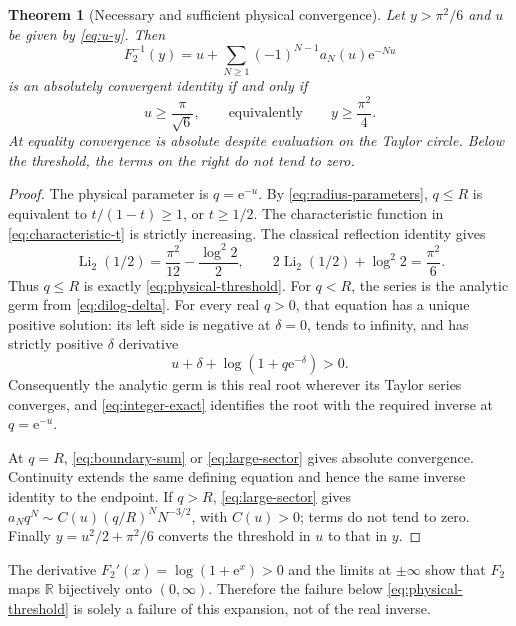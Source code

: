 \documentclass[11pt,a4paper]{article}
\newtheorem{theorem}{Theorem}[section]
\theoremstyle{definition}\newtheorem{definition}[theorem]{Definition}
\theoremstyle{remark}\newtheorem{remark}[theorem]{Remark}
\newcommand{\Li}{\operatorname{Li}}
\newcommand{\ee}{\mathrm e}
\newcommand{\R}{\mathbb R}
\numberwithin{equation}{section}
\begin{document}
\begin{theorem}[Necessary and sufficient physical convergence]\label{thm:threshold}
Let $y>\pi^2/6$ and $u$ be given by \eqref{eq:u-y}. Then
\begin{equation}\label{eq:physical-series}
 F_2^{-1}(y)=u+\sum_{N\ge1}(-1)^{N-1}a_N(u)\ee^{-Nu}
\end{equation}
is an absolutely convergent identity if and only if
\begin{equation}\label{eq:physical-threshold}
 u\ge\frac\pi{\sqrt6},\qquad\text{equivalently}\qquad
 y\ge\frac{\pi^2}{4}.
\end{equation}
At equality convergence is absolute despite evaluation on the Taylor
circle. Below the threshold, the terms on the right do not tend to zero.
\end{theorem}
\begin{proof}
The physical parameter is $q=\ee^{-u}$. By \eqref{eq:radius-parameters},
$q\le R$ is equivalent to $t/(1-t)\ge1$, or $t\ge1/2$.
The characteristic function in \eqref{eq:characteristic-t} is strictly
increasing. The classical reflection identity gives
\[
 \Li_2(1/2)=\frac{\pi^2}{12}-\frac{\log^2 2}{2},\qquad
 2\Li_2(1/2)+\log^2 2=\frac{\pi^2}{6}.
\]
Thus $q\le R$ is exactly \eqref{eq:physical-threshold}.
For $q<R$, the series is the analytic germ from \eqref{eq:dilog-delta}.
For every real $q>0$, that equation has a unique positive solution:
its left side is negative at $\delta=0$, tends to infinity, and has
strictly positive $\delta$ derivative
\[
 u+\delta+\log(1+q\ee^{-\delta})>0.
\]
Consequently the analytic germ is this real root wherever its Taylor
series converges, and \eqref{eq:integer-exact} identifies the root with
the required inverse at $q=\ee^{-u}$.

At $q=R$, \eqref{eq:boundary-sum} or \eqref{eq:large-sector} gives absolute
convergence. Continuity extends the same defining equation and hence the
same inverse identity to the endpoint. If $q>R$, \eqref{eq:large-sector}
gives
$a_Nq^N\sim C(u)(q/R)^NN^{-3/2}$, with $C(u)>0$; terms do not tend to
zero. Finally $y=u^2/2+\pi^2/6$ converts the threshold in $u$ to that in
$y$.
\end{proof}

The derivative $F_2'(x)=\log(1+\ee^x)>0$ and the limits at $\pm\infty$
show that $F_2$ maps $\R$ bijectively onto $(0,\infty)$. Therefore the
failure below \eqref{eq:physical-threshold} is solely a failure of this
expansion, not of the real inverse.
\end{document}
